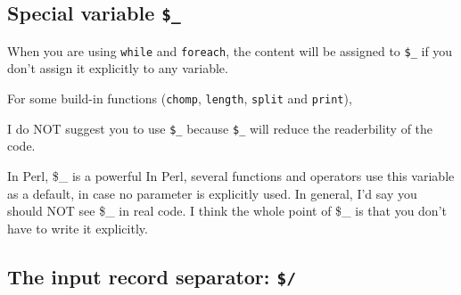 \documentclass[]{book}
\makeatletter
\newenvironment{Shaded}{\begin{snugshade}}{\end{snugshade}}
\newcommand{\CharTok}[1]{\textcolor[rgb]{0.31,0.60,0.02}{#1}}
\newcommand{\DataTypeTok}[1]{\textcolor[rgb]{0.13,0.29,0.53}{#1}}
\newcommand{\FunctionTok}[1]{\textcolor[rgb]{0.00,0.00,0.00}{#1}}
\newcommand{\KeywordTok}[1]{\textcolor[rgb]{0.13,0.29,0.53}{\textbf{#1}}}
\newcommand{\NormalTok}[1]{#1}
\newcommand{\StringTok}[1]{\textcolor[rgb]{0.31,0.60,0.02}{#1}}
\newenvironment{kframe}{%
\medskip{}
\setlength{\fboxsep}{.8em}
 \def\at@end@of@kframe{}%
 \ifinner\ifhmode%
  \def\at@end@of@kframe{\end{minipage}}%
  \begin{minipage}{\columnwidth}%
 \fi\fi%
 \def\FrameCommand##1{\hskip\@totalleftmargin \hskip-\fboxsep
 \colorbox{shadecolor}{##1}\hskip-\fboxsep
     \hskip-\linewidth \hskip-\@totalleftmargin \hskip\columnwidth}%
 \MakeFramed {\advance\hsize-\width
   \@totalleftmargin\z@ \linewidth\hsize
   \@setminipage}}%
 {\par\unskip\endMakeFramed%
 \at@end@of@kframe}
\renewenvironment{Shaded}{\begin{kframe}}{\end{kframe}}
\makeatother
\begin{document}
\hypertarget{special-variable-_}{%
\subsection{\texorpdfstring{Special variable \texttt{\$\_}}{Special variable \$\_}}\label{special-variable-_}}

\begin{Shaded}
\end{Shaded}

When you are using \texttt{while} and \texttt{foreach}, the content will be assigned to \texttt{\$\_} if you don't assign it explicitly to any variable.

For some build-in functions (\texttt{chomp}, \texttt{length}, \texttt{split} and \texttt{print}),

I do NOT suggest you to use \texttt{\$\_} because \texttt{\$\_} will reduce the readerbility of the code.

In Perl, \$\_ is a powerful
In Perl, several functions and operators use this variable as a default, in case no parameter is explicitly used. In general, I'd say you should NOT see \$\_ in real code. I think the whole point of \$\_ is that you don't have to write it explicitly.

\hypertarget{the-input-record-separator}{%
\subsection{\texorpdfstring{The input record separator: \texttt{\$/}}{The input record separator: \$/}}\label{the-input-record-separator}}
\end{document}

